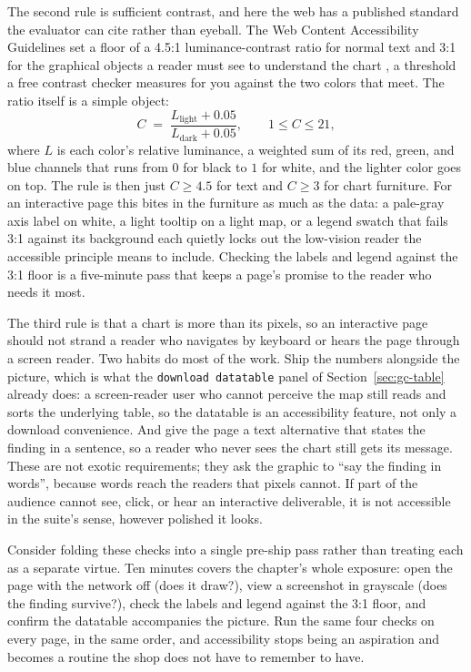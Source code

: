 The second rule is sufficient contrast, and here the web has a published standard the evaluator can cite rather than eyeball. The Web Content Accessibility Guidelines set a floor of a 4.5:1 luminance-contrast ratio for normal text and 3:1 for the graphical objects a reader must see to understand the chart \parencite{w3c2018wcag}, a threshold a free contrast checker measures for you against the two colors that meet. The ratio itself is a simple object:
\[
  C \;=\; \frac{L_{\text{light}} + 0.05}{L_{\text{dark}} + 0.05},
  \qquad 1 \le C \le 21,
\]
where $L$ is each color's relative luminance, a weighted sum of its red, green, and blue channels that runs from $0$ for black to $1$ for white, and the lighter color goes on top. The rule is then just $C \ge 4.5$ for text and $C \ge 3$ for chart furniture. For an interactive page this bites in the furniture as much as the data: a pale-gray axis label on white, a light tooltip on a light map, or a legend swatch that fails 3:1 against its background each quietly locks out the low-vision reader the accessible principle means to include. Checking the labels and legend against the 3:1 floor is a five-minute pass that keeps a page's promise to the reader who needs it most.

The third rule is that a chart is more than its pixels, so an interactive page should not strand a reader who navigates by keyboard or hears the page through a screen reader. Two habits do most of the work. Ship the numbers alongside the picture, which is what the \texttt{download datatable} panel of Section~\ref{sec:gc-table} already does: a screen-reader user who cannot perceive the map still reads and sorts the underlying table, so the datatable is an accessibility feature, not only a download convenience. And give the page a text alternative that states the finding in a sentence, so a reader who never sees the chart still gets its message. These are not exotic requirements; they ask the graphic to \enquote{say the finding in words}, because words reach the readers that pixels cannot. If part of the audience cannot see, click, or hear an interactive deliverable, it is not accessible in the suite's sense, however polished it looks.

Consider folding these checks into a single pre-ship pass rather than treating each as a separate virtue. Ten minutes covers the chapter's whole exposure: open the page with the network off (does it draw?), view a screenshot in grayscale (does the finding survive?), check the labels and legend against the 3:1 floor, and confirm the datatable accompanies the picture. Run the same four checks on every page, in the same order, and accessibility stops being an aspiration and becomes a routine the shop does not have to remember to have.

